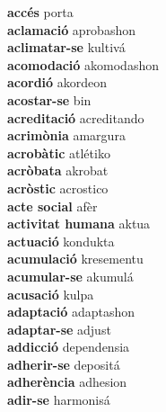 \textbf{ accés  } porta \\
\textbf{ aclamació  } aprobashon \\
\textbf{ aclimatar-se  } kultivá \\
\textbf{ acomodació  } akomodashon \\
\textbf{ acordió  } akordeon \\
\textbf{ acostar-se  } bin \\
\textbf{ acreditació  } acreditando \\
\textbf{ acrimònia  } amargura \\
\textbf{ acrobàtic  } atlétiko \\
\textbf{ acròbata  } akrobat \\
\textbf{ acròstic  } acrostico \\
\textbf{ acte social  } afèr \\
\textbf{ activitat humana  } aktua \\
\textbf{ actuació  } kondukta \\
\textbf{ acumulació  } kresementu \\
\textbf{ acumular-se  } akumulá \\
\textbf{ acusació  } kulpa \\
\textbf{ adaptació  } adaptashon \\
\textbf{ adaptar-se  } adjust \\
\textbf{ addicció  } dependensia \\
\textbf{ adherir-se  } depositá \\
\textbf{ adherència  } adhesion \\
\textbf{ adir-se  } harmonisá \\
